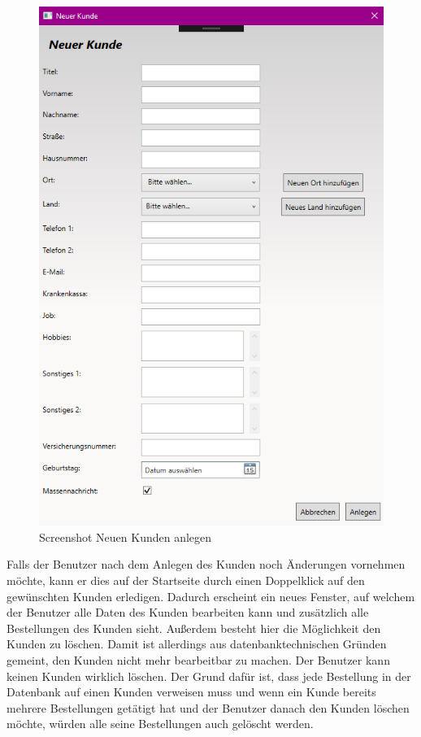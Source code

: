 \begin{figure}[H]
\begin{center}
	\includegraphics[scale=.6]{images/NeuerKunde.png}
\end{center}
	\caption{Screenshot Neuen Kunden anlegen}
	\label{fig:sample}
\end{figure}
\noindent Falls der Benutzer nach dem Anlegen des Kunden noch Änderungen vornehmen möchte, kann er dies auf der Startseite durch einen Doppelklick auf den gewünschten Kunden erledigen. Dadurch erscheint ein neues Fenster, auf welchem der Benutzer alle Daten des Kunden bearbeiten kann und zusätzlich alle Bestellungen des Kunden sieht. Außerdem besteht hier die Möglichkeit den Kunden zu löschen. Damit ist allerdings aus datenbanktechnischen Gründen gemeint, den Kunden nicht mehr bearbeitbar zu machen. Der Benutzer kann keinen Kunden wirklich löschen. Der Grund dafür ist, dass jede Bestellung in der Datenbank auf einen Kunden verweisen muss und wenn ein Kunde bereits mehrere Bestellungen getätigt hat und der Benutzer danach den Kunden löschen möchte, würden alle seine Bestellungen auch gelöscht werden. 
